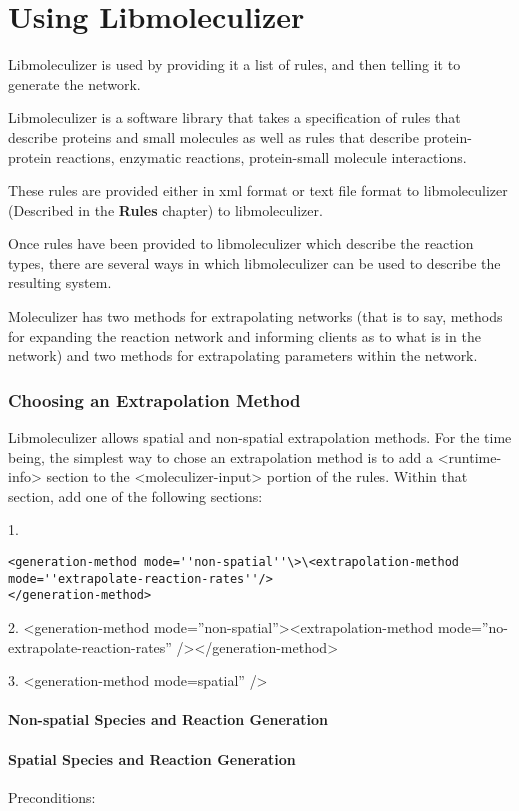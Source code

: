 \chapter{Using Libmoleculizer}
Libmoleculizer is used by providing it a list of rules, and then
telling it to generate the network.  


Libmoleculizer is a software library that takes a specification of
rules that describe proteins and small molecules as well as rules that
describe protein-protein reactions, enzymatic reactions, protein-small
molecule interactions.  

These rules are provided either in xml format or text file format to
libmoleculizer (Described in the {\bf Rules} chapter) to
libmoleculizer. 

Once rules have been provided to libmoleculizer which describe the
reaction types, there are several ways in which libmoleculizer can be
used to describe the resulting system.  

Moleculizer has two methods for extrapolating networks (that is to
say, methods for expanding the reaction network and informing clients
as to what is in the network) and two methods for extrapolating
parameters within the network.  

\subsection{Choosing an Extrapolation Method}

Libmoleculizer allows spatial and non-spatial extrapolation methods.
For the time being, the simplest way to chose an extrapolation method
is to add a <runtime-info> section to the <moleculizer-input> portion
of the rules.  Within that section, add one of the following sections: 

1.
\begin{verbatim}
<generation-method mode=''non-spatial''\>\<extrapolation-method
mode=''extrapolate-reaction-rates''/>
</generation-method>
\end{verbatim}


2.
<generation-method mode=''non-spatial''><extrapolation-method
mode=''no-extrapolate-reaction-rates'' /></generation-method>

3.
<generation-method mode=spatial'' />


\subsubsection{Non-spatial Species and Reaction Generation}
\subsubsection{Spatial Species and Reaction Generation}

Preconditions:



